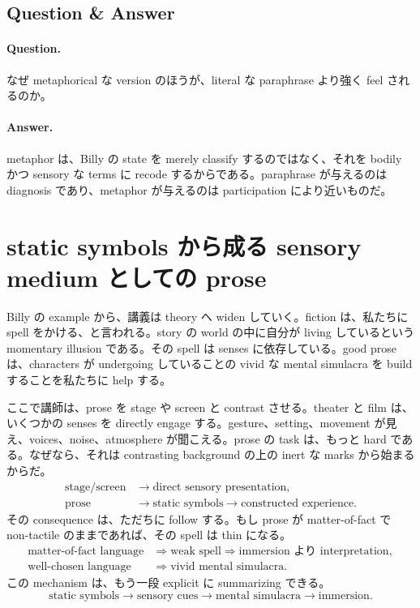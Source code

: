 \subsection{Question \& Answer}

\paragraph{Question.} なぜ metaphorical な version のほうが、literal な paraphrase より強く feel されるのか。

\paragraph{Answer.} metaphor は、Billy の state を merely classify するのではなく、それを bodily かつ sensory な terms に recode するからである。paraphrase が与えるのは diagnosis であり、metaphor が与えるのは participation により近いものだ。

\section{static symbols から成る sensory medium としての prose}

Billy の example から、講義は theory へ widen していく。fiction は、私たちに spell をかける、と言われる。story の world の中に自分が living しているという momentary illusion である。その spell は senses に依存している。good prose は、characters が undergoing していることの vivid な mental simulacra を build することを私たちに help する。

ここで講師は、prose を stage や screen と contrast させる。theater と film は、いくつかの senses を directly engage する。gesture、setting、movement が見え、voices、noise、atmosphere が聞こえる。prose の task は、もっと hard である。なぜなら、それは contrasting background の上の inert な marks から始まるからだ。
\begin{align}
\text{stage/screen} &\to \text{direct sensory presentation},\\
\text{prose} &\to \text{static symbols} \to \text{constructed experience}.
\end{align}
その consequence は、ただちに follow する。もし prose が matter-of-fact で non-tactile のままであれば、その spell は thin になる。
\begin{align}
\text{matter-of-fact language} &\Rightarrow \text{weak spell} \Rightarrow \text{immersion より interpretation},\\
\text{well-chosen language} &\Rightarrow \text{vivid mental simulacra}.
\end{align}
この mechanism は、もう一段 explicit に summarizing できる。
\begin{equation}
\text{static symbols} \to \text{sensory cues} \to \text{mental simulacra} \to \text{immersion}.
\end{equation}

